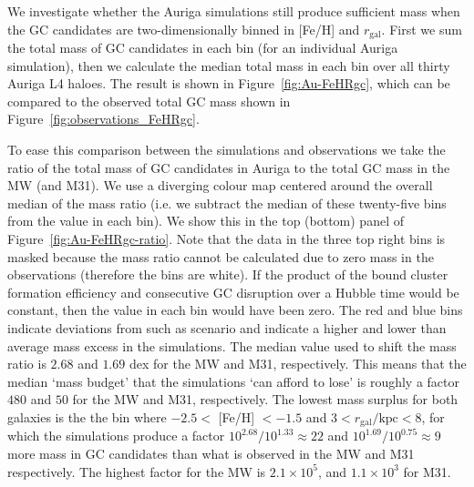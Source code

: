 \documentclass[a4paper,fleqn,usenatbib]{mnras}
\begin{document}
We investigate whether the Auriga simulations still produce sufficient mass when
the GC candidates are two-dimensionally binned in [Fe/H] and $r_\text{gal}$. First
we sum the total mass of GC candidates in each bin (for an individual Auriga 
simulation), then we calculate the median total mass in each bin over all 
thirty Auriga L4 haloes. The result is shown in Figure~\ref{fig:Au-FeHRgc}, which 
can be compared to the observed total GC mass shown in 
Figure~\ref{fig:observations_FeHRgc}.

To ease this comparison between the simulations and observations we take the ratio
of the total mass of GC candidates in Auriga to the total GC mass in the MW 
(and M31). We use a diverging colour map centered around the overall median of the 
mass ratio (i.e. we subtract the median of these twenty-five bins from the value 
in each bin). We show this in the top (bottom) panel of Figure~\ref{fig:Au-FeHRgc-ratio}.
Note that the data in the three top right bins is masked because the mass ratio cannot 
be calculated due to zero mass in the observations (therefore the bins are white).
If the product of the bound cluster formation efficiency and consecutive GC 
disruption over a Hubble time would be constant, then the value in each bin would
have been zero. The red and blue bins indicate deviations from such as scenario and
indicate a higher and lower than average mass excess in the simulations. The median 
value used to shift the mass ratio is $2.68$ and $1.69$ dex for the MW and M31, 
respectively. This means that the median `mass budget' that the simulations `can 
afford to lose' is roughly a factor $480$ and $50$ for the MW and M31, respectively. 
The lowest mass surplus for both galaxies is the the bin where $-2.5 <$ [Fe/H] 
$< -1.5$ and $3 < r_{\text{gal}}/\text{kpc} < 8$, for which the simulations produce 
a factor $10^{2.68}/10^{1.33} \approx 22$ and $10^{1.69}/10^{0.75} \approx 9$ 
more mass in GC candidates than what is observed in the MW and M31 respectively.
The highest factor for the MW is $2.1 \times 10^{5}$, and $1.1 \times 10^{3}$
for M31.
\end{document}
